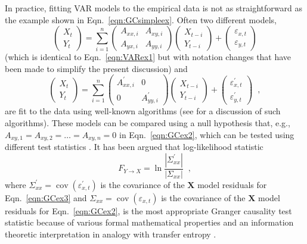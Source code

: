 In practice, fitting VAR models to the empirical data is not as straightforward as the example shown in Eqn.\ \ref{eqn:GCsimpleex}.  Often two different models,
\begin{equation}
\label{eqn:GCex2}
\begin{pmatrix}
X_t \\ 
Y_t
\end{pmatrix} = \sum_{i=1}^n \begin{pmatrix}
A_{xx,i} & A_{xy,i}\\
A_{yx,i} & A_{yy,i}
\end{pmatrix}\begin{pmatrix}
X_{t-i} \\ 
Y_{t-i}
\end{pmatrix} + \begin{pmatrix}
\varepsilon_{x,t}\\
\varepsilon_{y,t}
\end{pmatrix}
\end{equation}
(which is identical to Eqn.\ \ref{eqn:VARex1} but with notation changes that have been made to simplify the present discussion) and
\begin{equation}
\label{eqn:GCex3}
\begin{pmatrix}
X_t \\ 
Y_t
\end{pmatrix} = \sum_{i=1}^n \begin{pmatrix}
A_{xx,i}^\prime & 0\\
0 & A_{yy,i}^\prime
\end{pmatrix}\begin{pmatrix}
X_{t-i} \\ 
Y_{t-i}
\end{pmatrix} + \begin{pmatrix}
\varepsilon_{x,t}^\prime\\
\varepsilon_{y,t}^\prime
\end{pmatrix}\;\;,
\end{equation}
are fit to the data using well-known algorithms (see \cite{Barnett2014} for a discussion of such algorithms).  These models can be compared using a null hypothesis that, e.g., $A_{xy,1}=A_{xy,2}=\ldots=A_{xy,n}=0$ in Eqn.\ \ref{eqn:GCex2}, which can be tested using different test statistics \cite{Barnett2014,Toda1994}.  It has been argued that log-likelihood statistic
\begin{equation}
F_{Y\rightarrow X} = \ln\frac{|\Sigma_{xx}^\prime|}{|\Sigma_{xx}|}\;\;,
\end{equation}
where $\Sigma_{xx}^\prime=\mathop{cov}(\varepsilon_{x,t}^\prime)$ is the covariance of the $\mathbf{X}$ model residuals for Eqn.\ \ref{eqn:GCex3} and $\Sigma_{xx}=\mathop{cov}(\varepsilon_{x,t})$ is the covariance of the $\mathbf{X}$ model residuals for Eqn.\ \ref{eqn:GCex2}, is the most appropriate Granger causality test statistic because of various formal mathematical properties and an information theoretic interpretation in analogy with transfer entropy \cite{Barnett2014,Barnett2009}.


